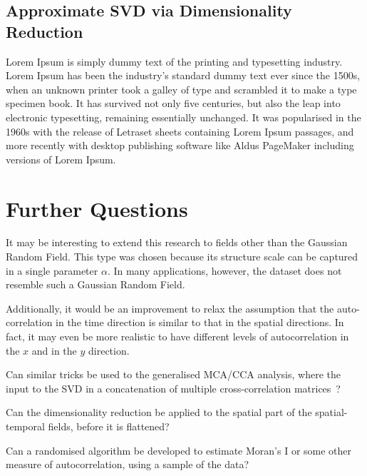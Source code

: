 \documentclass{acm_proc_article-sp}
\begin{document}
\subsection{Approximate SVD via Dimensionality Reduction}
\label{sec:Applications Approximate SVD via Dimensionality Reduction}

Lorem Ipsum is simply dummy text of the printing and typesetting industry. Lorem Ipsum has been the industry's standard dummy text ever since the 1500s, when an unknown printer took a galley of type and scrambled it to make a type specimen book. It has survived not only five centuries, but also the leap into electronic typesetting, remaining essentially unchanged. It was popularised in the 1960s with the release of Letraset sheets containing Lorem Ipsum passages, and more recently with desktop publishing software like Aldus PageMaker including versions of Lorem Ipsum.

\section{Further Questions}
\label{Further Questions}

It may be interesting to extend this research to fields other than the Gaussian Random Field. This type was chosen because its structure scale can be captured in a single parameter $\alpha$. In many applications, however, the dataset does not resemble such a Gaussian Random Field.

Additionally, it would be an improvement to relax the assumption that the auto-correlation in the time direction is similar to that in the spatial directions. In fact, it may even be more realistic to have different levels of autocorrelation in the $x$ and in the $y$ direction.

Can similar tricks be used to the generalised MCA/CCA analysis, where the input to the SVD in a concatenation of multiple cross-correlation matrices~\cite{Carroll1970, Kettenring1971}?

Can the dimensionality reduction be applied to the spatial part of the spatial-temporal fields, before it is flattened?

Can a randomised algorithm be developed to estimate Moran's I or some other measure of autocorrelation, using a sample of the data?

{
\footnotesize


}
\end{document}
